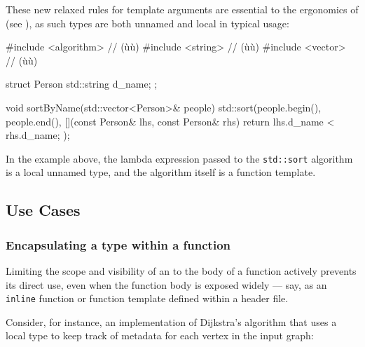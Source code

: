 These new relaxed rules for template arguments are essential to the
ergonomics of  (see ), as such types are both
unnamed and local in typical usage:

\newpage%
\begin{emcppslisting}
#include <algorithm>  // (ù{}ù)
#include <string>     // (ù{}ù)
#include <vector>     // (ù{}ù)

struct Person { std::string d_name; };

void sortByName(std::vector<Person>& people)
{
    std::sort(people.begin(), people.end(),
              [](const Person& lhs, const Person& rhs)
              {
                  return lhs.d_name < rhs.d_name;
              });
}
\end{emcppslisting}

\noindent In the example above, the lambda expression passed to the
\lstinline!std::sort! algorithm is a local unnamed type, and the algorithm
itself is a function template.

\subsection[Use Cases]{Use Cases}\label{use-cases}

\subsubsection[Encapsulating a type within a function]{Encapsulating a type within a function}\label{encapsulating-a-type-within-a-function}

Limiting the scope and visibility of an  to the body of a
function actively prevents its direct use, even when the function body
is exposed widely --- say, as an \lstinline!inline! function or function
template defined within a header file.

Consider, for instance, an implementation of Dijkstra's algorithm that
uses a local type to keep track of metadata for each vertex in the input
graph:

